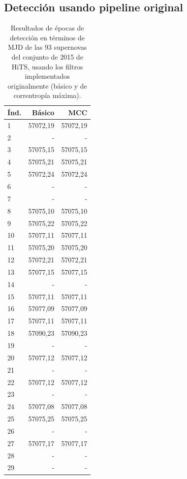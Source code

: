 \begin{appendix}
\section{Detecci\'on usando pipeline original}
\begin{table}[h!]
\small
\centering
\caption{Resultados de \'epocas de detecci\'on en t\'erminos de MJD de las 93 supernovas del conjunto de 2015 de HiTS, usando los filtros implementados originalmente (b\'asico y de correntrop\'ia m\'axima).}
\begin{tabular}{|l|r|r|}
\hline
\textbf{\'Ind.} & \textbf{B\'asico} & \textbf{MCC}   \\
\hline
1&57072,19 & 57072,19 \\
2&-             & -             \\
3&57075,15 & 57075,15 \\
4&57075,21 & 57075,21 \\
5&57072,24 & 57072,24 \\
6&-             & -             \\
7&-             & -             \\
8&57075,10 & 57075,10 \\
9&57075,22 & 57075,22 \\
10&57077,11 & 57077,11 \\
11&57075,20 & 57075,20 \\
12&57072,21 & 57072,21 \\
13&57077,15 & 57077,15 \\
14&-             & -             \\
15&57077,11 & 57077,11\\
16&57077,09 & 57077,09\\
17&57077,11 & 57077,11 \\
18&57090,23 & 57090,23 \\
19&-             & -             \\
20&57077,12   & 57077,12  \\
21&-             & -             \\
22&57077,12 & 57077,12 \\
23&-             & -             \\
24&57077,08  & 57077,08   \\
25&57075,25 & 57075,25 \\
26&-             & -             \\
27&57077,17 & 57077,17 \\
28&-             & -             \\
29&-             & -             \\

\end{tabular}
\end{table}
\end{appendix}
